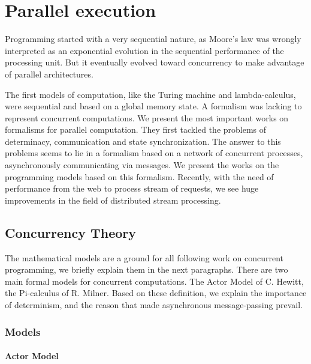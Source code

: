 \section{Parallel execution} \label{chapter3:parallel-execution}

Programming started with a very sequential nature, as Moore's law \cite{Moore1965} was wrongly interpreted as an exponential evolution in the sequential performance of the processing unit.
But it eventually evolved toward concurrency to make advantage of parallel architectures.

The first models of computation, like the Turing machine and lambda-calculus, were sequential and based on a global memory state.
A formalism was lacking to represent concurrent computations.
We present the most important works on formalisms for parallel computation.
They first tackled the problems of determinacy, communication and state synchronization.
The answer to this problems seems to lie in a formalism based on a network of concurrent processes, asynchronously communicating via messages.
We present the works on the programming models based on this formalism.
Recently, with the need of performance from the web to process stream of requests, we see huge improvements in the field of distributed stream processing.

\subsection{Concurrency Theory} \label{chapter3:parallel-execution:concurrency-theory}

The mathematical models are a ground for all following work on concurrent programming, we briefly explain them in the next paragraphs.
There are two main formal models for concurrent computations.
The Actor Model of C. Hewitt, the Pi-calculus of R. Milner.
Based on these definition, we explain the importance of determinism, and the reason that made asynchronous message-passing prevail.


\subsubsection{Models}

\paragraph{Actor Model}

